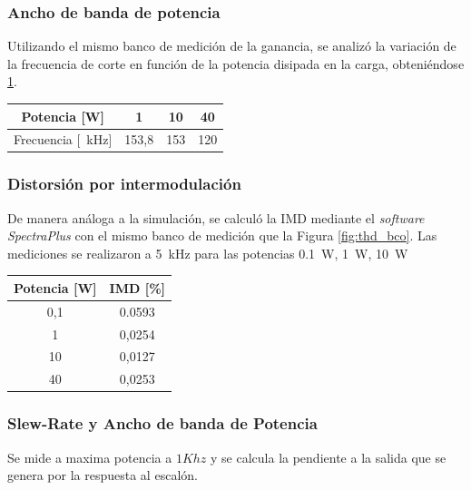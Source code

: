 \subsubsection{Ancho de banda de potencia}

Utilizando el mismo banco de medición de la ganancia, se analizó la variación de la frecuencia de corte en función de la potencia disipada en la carga, obteniéndose \ref{tab.bw_pote}.

\begin{table}[H]
	\centering
	\begin{tabular}{cccc}
		\toprule
		Potencia [W] & 1 & 10 & 40 \\
		\midrule
		Frecuencia [\SI{}{\kilo\hertz}] & 153,8 & 153 & 120 \\
		\bottomrule
	\end{tabular}
	\label{tab.bw_pote}
\end{table}
%
%
		\subsubsection{Distorsión por intermodulación}

		De manera análoga a la simulación, se calculó la IMD mediante el \textit{software SpectraPlus} con el mismo banco de medición que la Figura \ref{fig:thd_bco}. Las mediciones se realizaron a \SI{5}{\kilo\hertz} para las potencias \SI{0.1}{\watt}, \SI{1}{\watt}, \SI{10}{\watt}

			\begin{table}[H]
				\centering
				\begin{tabular}{cc}
				\toprule
				Potencia [W] & IMD [\%]\\
				\midrule
				0,1 & 0.0593 \\
				1 & 0,0254 \\
				10 & 0,0127 \\
				40 & 0,0253 \\
				\bottomrule
				\end{tabular}
			\end{table}



		\subsubsection{Slew-Rate y Ancho de banda de Potencia}
		Se mide a maxima potencia a $1Khz$ y se calcula la pendiente a la salida que se genera por la respuesta al escalón.
	

